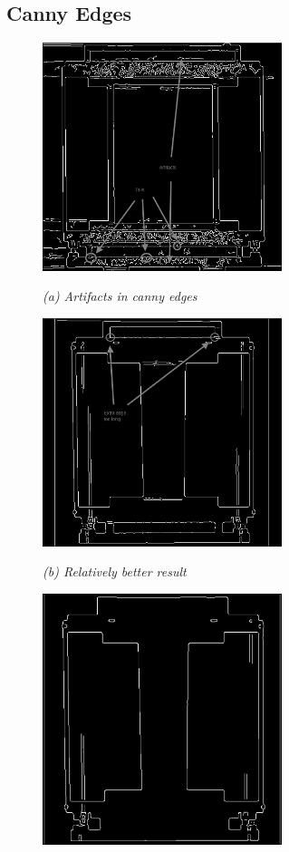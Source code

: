 \subsection{Canny Edges}
\begin{figure}[htb]
  \begin{minipage}[t]{2.75in}
    \centering
    \centerline{\mbox{\includegraphics[width=2.75in]{data_extraction/images/canny/cases/Canny_issue_artifacts.eps}}}
    \centerline{\emph{(a) Artifacts in canny edges}}
  \end{minipage}\medskip
  \begin{minipage}[t]{2.75in}
    \centering
    \centerline{\mbox{\includegraphics[width=2.75in]{data_extraction/images/canny/cases/Canny_issue_relatively_better.eps}}}
    \centerline{\emph{(b) Relatively better result}}
  \end{minipage}
  \begin{minipage}[t]{2.75in}
    \centering
    \centerline{\mbox{\includegraphics[width=2.75in]{data_extraction/images/canny/cases/Canny_issue_high_threshold.eps}}}

\end{minipage}
\end{figure}
